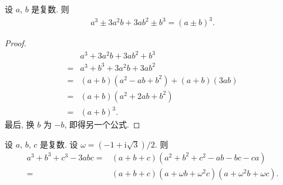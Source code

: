 \begin{theorem}
    设 \(a\), \(b\) 是复数.
    则
    \begin{align*}
        a^3 \pm 3a^2 b + 3ab^2 \pm b^3 = (a \pm b)^3.
    \end{align*}
\end{theorem}

\begin{proof}
    \begin{align*}
             & a^3 + 3a^2 b + 3ab^2 + b^3             \\
        = {} & a^3 + b^3 + 3a^2 b + 3ab^2             \\
        = {} & (a + b)(a^2 - ab + b^2) + (a + b)(3ab) \\
        = {} & (a + b)(a^2 + 2ab + b^2)               \\
        = {} & (a + b)^3.
    \end{align*}
    最后, 换 \(b\) 为 \(-b\),
    即得另一个公式.
\end{proof}

\begin{theorem}
    设 \(a\), \(b\), \(c\) 是复数.
    设 \(\omega = (-1 + \mathrm{i} \sqrt{3})/2\).
    则
    \begin{align*}
        a^3 + b^3 + c^3 - 3abc
        = {} & (a + b + c)(a^2 + b^2 + c^2 - ab - bc - ca) \\
        = {} & (a + b + c)(a + \omega b + \omega^2 c)
        (a + \omega^2 b + \omega c).
    \end{align*}
\end{theorem}

